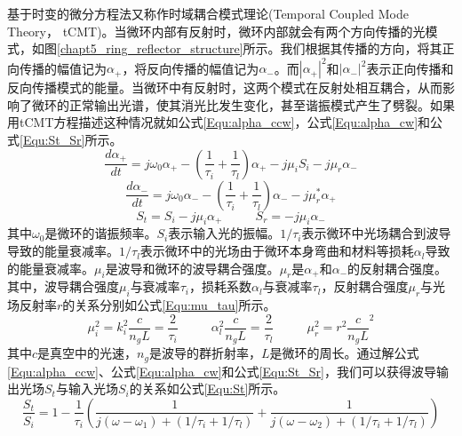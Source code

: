 基于时变的微分方程法又称作时域耦合模式理论(Temporal Coupled Mode Theory， tCMT)。当微环内部有反射时，微环内部就会有两个方向传播的光模式，如图\ref{chapt5_ring_reflector_structure}所示。我们根据其传播的方向，将其正向传播的幅值记为$\alpha_+$，将反向传播的幅值记为$\alpha_-$。而$|\alpha_+|^2$和$|\alpha_-|^2$表示正向传播和反向传播模式的能量。当微环中有反射时，这两个模式在反射处相互耦合，从而影响了微环的正常输出光谱，使其消光比发生变化，甚至谐振模式产生了劈裂。如果用tCMT方程描述这种情况就如公式\ref{Equ:alpha_ccw}，公式\ref{Equ:alpha_cw}和公式\ref{Equ:St_Sr}所示\cite{Li2016design}。
\begin{equation}
\label{Equ:alpha_ccw}
\frac{d\alpha_+}{dt}=j\omega_0\alpha_+-\left(\frac{1}{\tau_i}+\frac{1}{\tau_l}\right)\alpha_+-j\mu_iS_i-j\mu_r\alpha_-
\end{equation}
\begin{equation}
\label{Equ:alpha_cw}
\frac{d\alpha_-}{dt}=j\omega_0\alpha_--\left(\frac{1}{\tau_i}+\frac{1}{\tau_l}\right)\alpha_--j\mu_r^*\alpha_+
\end{equation}
\begin{equation}
\label{Equ:St_Sr}
S_t = S_i-j\mu_i\alpha_+ ~~~~~~~~~~~~ S_r = -j\mu_i\alpha_-
\end{equation}
其中$\omega_0$是微环的谐振频率。$S_i$表示输入光的振幅。$1/\tau_i$表示微环中光场耦合到波导导致的能量衰减率。$1/\tau_l$表示微环中的光场由于微环本身弯曲和材料等损耗$\alpha_l$导致的能量衰减率。$\mu_i$是波导和微环的波导耦合强度。$\mu_r$是$\alpha_+$和$\alpha_-$的反射耦合强度。其中，波导耦合强度$\mu_i$与衰减率$\tau_i$，损耗系数$\alpha_l$与衰减率$\tau_l$，反射耦合强度$\mu_r$与光场反射率$r$的关系分别如公式\ref{Equ:mu_tau}所示\cite{little1997microring}。
\begin{equation}
\label{Equ:mu_tau}
\mu_i^2=k_i^2\frac{c}{n_gL}=\frac{2}{\tau_i}~~~~~~~~~~~~\alpha_l^2\frac{c}{n_gL}=\frac{2}{\tau_l}~~~~~~~~~~~~\mu_r^2=r^2\frac{c}{n_gL}^2
\end{equation}
其中$c$是真空中的光速，$n_g$是波导的群折射率，$L$是微环的周长。通过解公式\ref{Equ:alpha_ccw}、公式\ref{Equ:alpha_cw}和公式\ref{Equ:St_Sr}，我们可以获得波导输出光场$S_t$与输入光场$S_i$的关系如公式\ref{Equ:St}所示。
\begin{equation}
\label{Equ:St}
\frac{S_t}{S_i}=1-\frac{1}{\tau_i}\left(\frac{1}{j(\omega-\omega_1)+(1/\tau_i+1/\tau_l)} + \frac{1}{j(\omega-\omega_2)+(1/\tau_i+1/\tau_l)}\right)
\end{equation}

